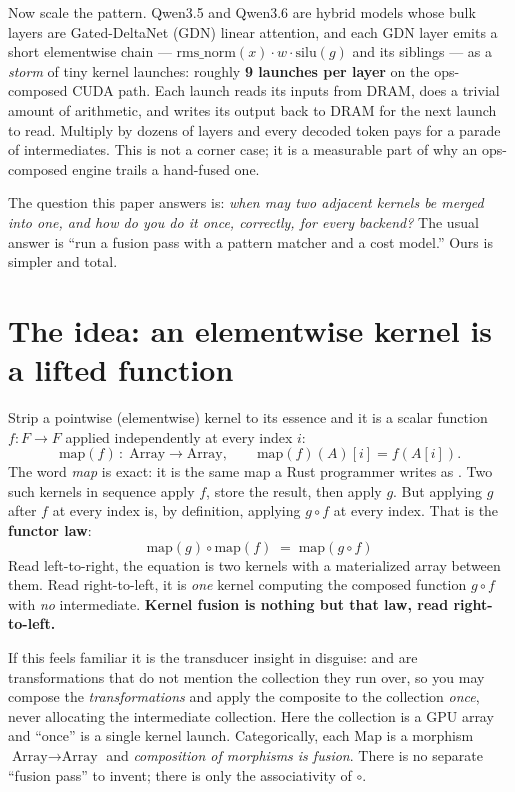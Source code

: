 \documentclass[11pt]{article}
\begin{document}
Now scale the pattern. Qwen3.5 and Qwen3.6 are hybrid models whose bulk layers are Gated-DeltaNet
(GDN) linear attention, and each GDN layer emits a short elementwise chain ---
$\mathrm{rms\_norm}(x)\cdot w\cdot\mathrm{silu}(g)$ and its siblings --- as a \emph{storm} of tiny kernel
launches: roughly \textbf{9 launches per layer} on the ops-composed CUDA path. Each launch reads its
inputs from DRAM, does a trivial amount of arithmetic, and writes its output back to DRAM for the next
launch to read. Multiply by dozens of layers and every decoded token pays for a parade of intermediates.
This is not a corner case; it is a measurable part of why an ops-composed engine trails a hand-fused one.

The question this paper answers is: \emph{when may two adjacent kernels be merged into one, and how do
you do it once, correctly, for every backend?} The usual answer is ``run a fusion pass with a pattern
matcher and a cost model.'' Ours is simpler and total.

\section{The idea: an elementwise kernel is a lifted function}
\label{sec:idea}

Strip a pointwise (elementwise) kernel to its essence and it is a scalar function $f:F\to F$ applied
independently at every index $i$:
\[
\mathrm{map}(f)\,:\;\text{Array}\to\text{Array},\qquad \mathrm{map}(f)(A)[i]=f(A[i]).
\]
The word \emph{map} is exact: it is the same map a Rust programmer writes as . Two
such kernels in sequence apply $f$, store the result, then apply $g$. But applying $g$ after $f$ at every
index is, by definition, applying $g\circ f$ at every index. That is the \textbf{functor law}:
\[
\boxed{\;\mathrm{map}(g)\circ\mathrm{map}(f)\;=\;\mathrm{map}(g\circ f)\;}
\]
Read left-to-right, the equation is two kernels with a materialized array between them. Read
right-to-left, it is \emph{one} kernel computing the composed function $g\circ f$ with \emph{no}
intermediate. \textbf{Kernel fusion is nothing but that law, read right-to-left.}

If this feels familiar it is the transducer insight in disguise:  and  are
transformations that do not mention the collection they run over, so you may compose the
\emph{transformations} and apply the composite to the collection \emph{once}, never allocating the
intermediate collection. Here the collection is a GPU array and ``once'' is a single kernel launch.
Categorically, each Map is a morphism $\text{Array}\to\text{Array}$ and \emph{composition of morphisms is
fusion}. There is no separate ``fusion pass'' to invent; there is only the associativity of $\circ$.
\end{document}
